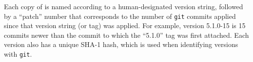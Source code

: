 

Each copy of \libflame is named according to a human-designated version
string, followed by a ``patch'' number that corresponds to the number of
{\tt git} commits applied since that version string (or tag) was applied.
For example, version 5.1.0-15 is 15 commits newer than the commit to which
the ``5.1.0'' tag was first attached.
Each version also has a unique SHA-1 hash, which is used when identifying
versions with {\tt git}.

